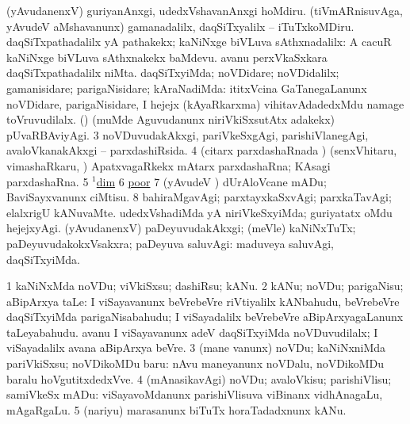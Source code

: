 \noindent 
\gl{\pagu}
\expl{}
\bmng
\bnum
{}  
\banum
{} (yAvudanenxV) guriyanAnxgi, udedxVshavanAnxgi hoMdiru. 
 (tiVmARnisuvAga, yAvudeV aMshavanunx) gamanadalilx, daqSiTxyalilx -- iTuTxkoMDiru. 
\eanum
\numie
{}  
\banum
{} daqSiTxpathadalilx yA pathakekx; kaNiNxge biVLuva sAthxnadalilx:  A cacuR kaNiNxge biVLuva sAthxnakekx baMdevu.  avanu perxVkaSxkara daqSiTxpathadalilx niMta. 
 daqSiTxyiMda; noVDidare; noVDidalilx; gamanisidare; parigaNisidare; kAraNadiMda:  ititxVcina GaTanegaLanunx noVDidare, parigaNisidare, I hejejx (kAyaRkarxma) vihitavAdadedxMdu namage toVruvudilalx. 
 (\pArxparx) (muMde Aguvudanunx niriVkiSxsutAtx adakekx) pUvaRBAviyAgi. 
\eanum
\numie
\num{3}  noVDuvudakAkxgi, pariVkeSxgAgi, parishiVlanegAgi, avaloVkanakAkxgi -- parxdashiRsida. 
\num{4}  (citarx parxdashaRnada \vi) (senxVhitaru, vimashaRkaru, \mo) ApatxvagaRkekx mAtarx parxdashaRna; KAsagi parxdashaRna. 
\num{5}  \hyperref{kandict_d.pdf}{D}{dim(1) nuga}{$^1$dim}  
\num{6}  \hyperref{kandict_p.pdf}{P}{poor pagu(3)}{poor}  
\num{7}  (yAvudeV \vi) dUrAloVcane mADu; BaviSayxvanunx ciMtisu. 
\num{8}  bahiraMgavAgi; parxtayxkaSxvAgi; parxkaTavAgi; elalxrigU kANuvaMte. 
  
\banum
{} udedxVshadiMda yA niriVkeSxyiMda; guriyatatx oMdu hejejxyAgi. 
 (yAvudanenxV) paDeyuvudakAkxgi; (meVle) kaNiNxTuTx; paDeyuvudakokxVsakxra; paDeyuva saluvAgi:  maduveya saluvAgi, daqSiTxyiMda. 
\eanum
\numie
\enum
\emng
\eentry

\bentry 
{} 
\gl{\sakirx}
\expl{}
\bmng
\bnum
\num{1} kaNiNxMda noVDu; viVkiSxsu; dashiRsu; kANu. 
\num{2} kANu; noVDu; parigaNisu; aBipArxya taLe:  I viSayavanunx beVrebeVre riVtiyalilx kANbahudu, beVrebeVre daqSiTxyiMda parigaNisabahudu; I viSayadalilx beVrebeVre aBipArxyagaLanunx taLeyabahudu.  avanu I viSayavanunx adeV daqSiTxyiMda noVDuvudilalx; I viSayadalilx avana aBipArxya beVre. 
\num{3} (mane \mo vanunx) noVDu; kaNiNxniMda pariVkiSxsu; noVDikoMDu baru:  nAvu maneyanunx noVDalu, noVDikoMDu baralu hoVgutitxdedxVve. 
\num{4} (mAnasikavAgi) noVDu; avaloVkisu; parishiVlisu; samiVkeSx mADu:  viSayavoMdanunx parishiVlisuva viBinanx vidhAnagaLu, mAgaRgaLu. 
\num{5} (nariyu) marasanunx biTuTx horaTadadxnunx kANu. 
\enum
\emng


